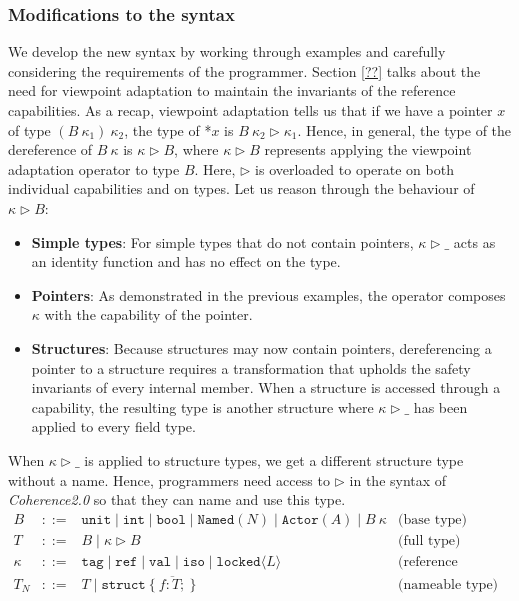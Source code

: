 \documentclass[a4paper,12pt,fleqn]{article}
\begin{document}
\subsubsection{Modifications to the syntax}
We develop the new syntax by working through examples and carefully considering the requirements of the programmer. Section \ref{??} talks about the need for viewpoint adaptation to maintain the invariants of the reference capabilities. As a recap, viewpoint adaptation tells us that if we have a pointer $x$ of type $(B \ \kappa_1) \ \kappa_2$, the type of *$x$ is $B \ \kappa_2 \triangleright \kappa_1$. Hence, in general, the type of the dereference of $B \ \kappa$ is $\kappa \triangleright B$, where $\kappa \triangleright B$ represents applying the viewpoint adaptation operator to type $B$. Here, $\triangleright$ is overloaded to operate on both individual capabilities and on types. Let us reason through the behaviour of $\kappa \triangleright B$:
\begin{itemize}
  \item \textbf{Simple types}: For simple types that do not contain pointers, $\kappa \triangleright \_$ acts as an identity function and has no effect on the type.
  \item \textbf{Pointers}: As demonstrated in the previous examples, the operator composes $\kappa$ with the capability of the pointer.
  \item \textbf{Structures}: Because structures may now contain pointers, dereferencing a pointer to a structure requires a transformation that upholds the safety invariants of every internal member. When a structure is accessed through a capability, the resulting type is another structure where $\kappa \triangleright \_$ has been applied to every field type.
\end{itemize}
When $\kappa \triangleright \_$ is applied to structure types, we get a different structure type without a name. Hence, programmers need access to $\triangleright$ in the syntax of \textit{Coherence2.0} so that they can name and use this type.
\[
\begin{array}{lcll}
B & ::= & \mathtt{unit} \mid \mathtt{int} \mid \mathtt{bool} \mid \mathtt{Named}(N) \mid \mathtt{Actor}(A) \mid B\ \kappa & \text{(base type)} \\[0.5em]
T & ::= & B \mid \kappa \triangleright B\ & \text{(full type)} \\[0.5em]

\kappa & ::= & \mathtt{tag} \mid \mathtt{ref} \mid \mathtt{val} \mid \mathtt{iso} \mid \mathtt{locked}\langle L \rangle & \text{(reference capabilities)} \\[0.5em]
T_N & ::= & T \mid \mathtt{struct}\ \{\ \overline{f : T;}\ \} & \text{(nameable type)}
\end{array}
\]
\end{document}
